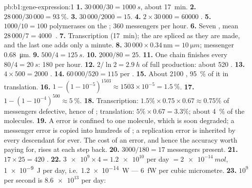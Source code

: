 \begin{solution}{pb:b1:gene-expression:1}
\textbf{1.} $30\,000/30 = \qty{1000}{s}$, about \qty{17}{min}.
\textbf{2.} $28\,000/30\,000 = \qty{93}{\%}$.
\textbf{3.} $30\,000/2000 = 15$.
\textbf{4.} $2\times 30\,000 = \num{60000}$ .
\textbf{5.} $1000/10 = 100$ polymerases on the ; 360 messengers
per hour.
\textbf{6.} Seven , mean $28\,000/7 = \qty{4000}{}$ .
\textbf{7.} Transcription (\qty{17}{min}); the  are spliced as
they are made, and the last one adds only a minute.
\textbf{8.}  $30\,000\times 0.34\,\mathrm{nm} = \qty{10}{\micro m}$; messenger \qty{0.68}{\micro m}.
\textbf{9.} $500/4 = \qty{125}{s}$.
\textbf{10.} $2000/80 = 25$.
\textbf{11.} One chain finishes every $80/4 = \qty{20}{s}$: 180 per
hour.
\textbf{12.} $2/\ln 2 = \qty{2.9}{h}$ of full production: about 520
.
\textbf{13.} $4\times 500 = 2000$ .
\textbf{14.} $60\,000/520 = 115$  per .
\textbf{15.} About 2100 , \qty{95}{\%} of it in translation.
\textbf{16.} $1 - (1 - 10^{-5})^{1503} \approx 1503\times 10^{-5} =
\qty{1.5}{\%}$.
\textbf{17.} $1 - (1 - 10^{-4})^{500} \approx \qty{5}{\%}$.
\textbf{18.} Transcription: $1.5\%\times 0.75\times 0.67 \approx
0.75\%$ of messengers defective, hence of ; translation:
$5\%\times 0.67 = 3.3\%$; about \qty{4}{\%} of the molecules.
\textbf{19.} A  error is confined to one molecule, which is
soon degraded; a messenger error is copied into hundreds of ;
a replication error is inherited by every descendant for ever. The
cost of an error, and hence the accuracy worth paying for, rises at
each step back.
\textbf{20.} $3000/180 = 17$ messengers present.
\textbf{21.} $17\times 25 = 420$ .
\textbf{22.} $\num{3e9}\times 4 = \num{1.2e10}$  per day
$= \qty{2e-14}{mol}$, \qty{1e-9}{J} per day, i.e.\ \qty{1.2e-14}{W}
--- \qty{6}{fW} per cubic micrometre.
\textbf{23.} $10^9$  per second is $\num{8.6e13}$ per day: 

\end{solution}

